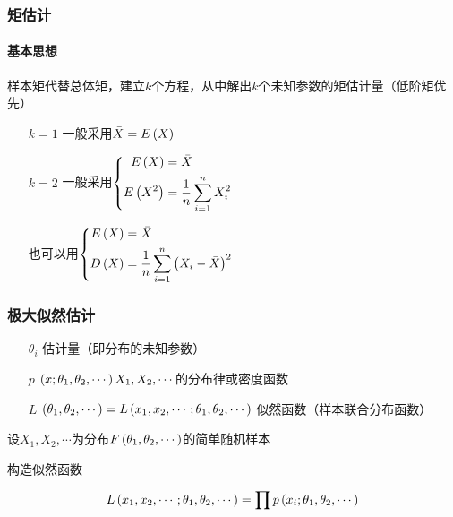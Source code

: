 \documentclass{article}
\begin{document}
\subsubsection{矩估计}

\paragraph{基本思想}

样本矩代替总体矩，建立$k$个方程，从中解出$k$个未知参数的矩估计量（低阶矩优先）

\begin{enumerate}
    \item [$k=1$] 一般采用$\bar X=E\left(X\right)$
    \item [$k=2$]
          一般采用$\left\{\begin{aligned}
                  E\left(X\right)      & =\bar X              \\
                  E\left(X^2\right) & =\frac1n\sum\limits_{i=1}^n X_i^2 \\
              \end{aligned}\right.$

          也可以用$\left\{\begin{aligned}
                  E\left(X\right)    & =\bar X                          \\
                  D\left(X\right) & =\frac1n\sum\limits_{i=1}^n{\left(X_i-\bar X\right)}^2 \\
              \end{aligned}\right.$
\end{enumerate}

\subsubsection{极大似然估计}

\begin{enumerate}
    \item [$\theta_i$] 估计量（即分布的未知参数）
    \item [$p$] $\left(x;\theta_1,\theta_2,\cdots\right)X_1,X_2,\cdots$的分布律或密度函数
    \item [$L$] $\left(\theta_1,\theta_2,\cdots\right)=L\left(x_1,x_2,\cdots;\theta_1,\theta_2,\cdots\right)$ 似然函数（样本联合分布函数）
\end{enumerate}

设$X_1,X_2,\cdots$为分布$F\left(\theta_1,\theta_2,\cdots\right)$的简单随机样本

构造似然函数

\[L\left(x_1,x_2,\cdots;\theta_1,\theta_2,\cdots\right)=\prod p\left(x_i;\theta_1,\theta_2,\cdots\right)\]
\end{document}
